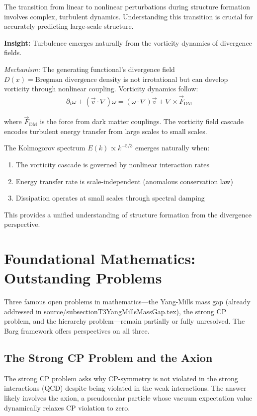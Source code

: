 \documentclass[12pt,a4paper]{article}
\begin{document}
The transition from linear to nonlinear perturbations during structure formation involves complex, turbulent dynamics. Understanding this transition is crucial for accurately predicting large-scale structure.

\textbf{Insight:} Turbulence emerges naturally from the vorticity dynamics of divergence fields.

\textit{Mechanism:} The generating functional's divergence field $D(x) = \text{Bregman divergence density}$ is not irrotational but can develop vorticity through nonlinear coupling. Vorticity dynamics follow:
\begin{align}
\partial_t \omega + (\vec{v} \cdot \nabla)\omega = (\omega \cdot \nabla)\vec{v} + \nabla \times \vec{F}_{\text{DM}}
\end{align}

where $\vec{F}_{\text{DM}}$ is the force from dark matter couplings. The vorticity field cascade encodes turbulent energy transfer from large scales to small scales.

The Kolmogorov spectrum $E(k) \propto k^{-5/3}$ emerges naturally when:
\begin{enumerate}
\item The vorticity cascade is governed by nonlinear interaction rates
\item Energy transfer rate is scale-independent (anomalous conservation law)
\item Dissipation operates at small scales through spectral damping
\end{enumerate}

This provides a unified understanding of structure formation from the divergence perspective.

\section{Foundational Mathematics: Outstanding Problems}

Three famous open problems in mathematics---the Yang-Mills mass gap (already addressed in source/subsectionT3YangMillsMassGap.tex), the strong CP problem, and the hierarchy problem---remain partially or fully unresolved. The Barg framework offers perspectives on all three.

\subsection{The Strong CP Problem and the Axion}

The strong CP problem asks why CP-symmetry is not violated in the strong interactions (QCD) despite being violated in the weak interactions. The answer likely involves the axion, a pseudoscalar particle whose vacuum expectation value dynamically relaxes CP violation to zero.
\end{document}

